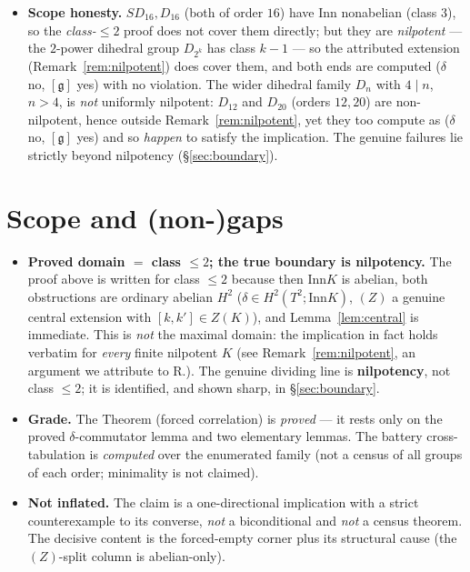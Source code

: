 \documentclass[11pt]{article}
\theoremstyle{definition}
\newcommand{\Inn}{\mathrm{Inn}}
\newcommand{\gerbe}{\mathfrak{g}}
\begin{document}
\begin{itemize}
$(\text{no},\text{no})$). Rank-$1$ base $S^1$: $H^2(S^1;-)=0$, both ends vanish, no content.
Trivial band: commutator $=0$, both obstructions $0$.
\item \textbf{Scope honesty.} $SD_{16},D_{16}$ (both of order $16$) have $\Inn$ nonabelian
(class $3$), so the \emph{class-$\le2$} proof does not cover them directly; but they are
\emph{nilpotent} --- the $2$-power dihedral group $D_{2^k}$ has class $k-1$ --- so the attributed
extension (Remark~\ref{rem:nilpotent}) does cover them, and both ends are computed ($\delta$ no,
$[\gerbe]$ yes) with no violation. The wider dihedral family $D_n$ with $4\mid n$, $n>4$, is
\emph{not} uniformly nilpotent: $D_{12}$ and $D_{20}$ (orders $12,20$) are non-nilpotent, hence
outside Remark~\ref{rem:nilpotent}, yet they too compute as ($\delta$ no, $[\gerbe]$ yes) and so
\emph{happen} to satisfy the implication. The genuine failures lie strictly beyond nilpotency
(\S\ref{sec:boundary}).
\end{itemize}

\section{Scope and (non-)gaps}\label{sec:scope}

\begin{itemize}
\item \textbf{Proved domain $=$ class $\le2$; the true boundary is nilpotency.} The proof above
is written for class $\le2$ because then $\Inn K$ is abelian, both obstructions are ordinary
abelian $H^2$ ($\delta\in H^2(T^2;\Inn K)$, $(Z)$ a genuine central extension with
$[k,k']\in Z(K)$), and Lemma~\ref{lem:central} is immediate. This is \emph{not} the maximal
domain: the implication in fact holds verbatim for \emph{every} finite nilpotent $K$ (see
Remark~\ref{rem:nilpotent}, an argument we attribute to R.). The genuine dividing line is
\textbf{nilpotency}, not class $\le2$; it is identified, and shown sharp, in
\S\ref{sec:boundary}.
\item \textbf{Grade.} The Theorem (forced correlation) is \emph{proved} --- it rests only on
the proved $\delta$-commutator lemma and two elementary lemmas. The battery cross-tabulation is
\emph{computed} over the enumerated family (not a census of all groups of each order; minimality
is not claimed).
\item \textbf{Not inflated.} The claim is a one-directional implication with a strict
counterexample to its converse, \emph{not} a biconditional and \emph{not} a census theorem. The
decisive content is the forced-empty corner plus its structural cause (the $(Z)$-split column is
abelian-only).
\end{itemize}
\end{document}

